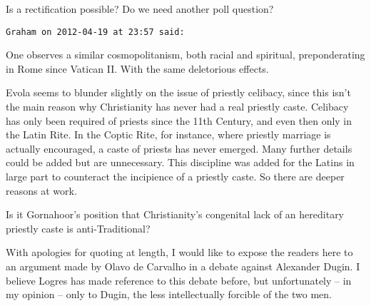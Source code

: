 \begin{footnotesize}
\begin{sffamily}
Is a rectification possible? Do we need another poll question?


\hfill

\texttt{Graham on 2012-04-19 at 23:57 said: }

One observes a similar cosmopolitanism, both racial and spiritual, preponderating in Rome since Vatican II. With the same deletorious effects.

Evola seems to blunder slightly on the issue of priestly celibacy, since this isn't the main reason why Christianity has never had a real priestly caste. Celibacy has only been required of priests since the 11th Century, and even then only in the Latin Rite. In the Coptic Rite, for instance, where priestly marriage is actually encouraged, a caste of priests has never emerged. Many further details could be added but are unnecessary. This discipline was added for the Latins in large part to counteract the incipience of a priestly caste. So there are deeper reasons at work.

Is it Gornahoor's position that Christianity's congenital lack of an hereditary priestly caste is anti-Traditional?

With apologies for quoting at length, I would like to expose the readers here to an argument made by Olavo de Carvalho in a debate against Alexander Dugin. I believe Logres has made reference to this debate before, but unfortunately – in my opinion – only to Dugin, the less intellectually forcible of the two men.


\end{sffamily}
\end{footnotesize}

